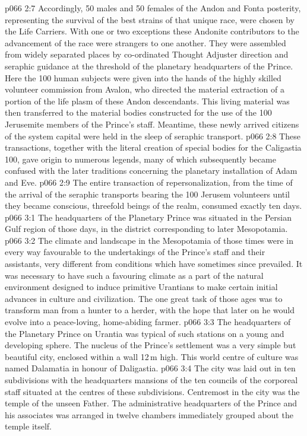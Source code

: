 \vs p066 2:7 Accordingly, 50 males and 50 females of the Andon and Fonta posterity, representing the survival of the best strains of that unique race, were chosen by the Life Carriers. With one or two exceptions these Andonite contributors to the advancement of the race were strangers to one another. They were assembled from widely separated places by co\hyp{}ordinated Thought Adjuster direction and seraphic guidance at the threshold of the planetary headquarters of the Prince. Here the 100 human subjects were given into the hands of the highly skilled volunteer commission from Avalon, who directed the material extraction of a portion of the life plasm of these Andon descendants. This living material was then transferred to the material bodies constructed for the use of the 100 Jerusemite members of the Prince’s staff. Meantime, these newly arrived citizens of the system capital were held in the sleep of seraphic transport.
\vs p066 2:8 \pc These transactions, together with the literal creation of special bodies for the Caligastia 100, gave origin to numerous legends, many of which subsequently became confused with the later traditions concerning the planetary installation of Adam and Eve.
\vs p066 2:9 The entire transaction of repersonalization, from the time of the arrival of the seraphic transports bearing the 100 Jerusem volunteers until they became conscious, threefold beings of the realm, consumed exactly ten days.
\vs p066 3:1 The headquarters of the Planetary Prince was situated in the Persian Gulf region of those days, in the district corresponding to later Mesopotamia.
\vs p066 3:2 The climate and landscape in the Mesopotamia of those times were in every way favourable to the undertakings of the Prince’s staff and their assistants, very different from conditions which have sometimes since prevailed. It was necessary to have such a favouring climate as a part of the natural environment designed to induce primitive Urantians to make certain initial advances in culture and civilization. The one great task of those ages was to transform man from a hunter to a herder, with the hope that later on he would evolve into a peace\hyp{}loving, home\hyp{}abiding farmer.
\vs p066 3:3 \pc The headquarters of the Planetary Prince on Urantia was typical of such stations on a young and developing sphere. The nucleus of the Prince’s settlement was a very simple but beautiful city, enclosed within a wall 12\,m high. This world centre of culture was named Dalamatia in honour of Daligastia.
\vs p066 3:4 The city was laid out in ten subdivisions with the headquarters mansions of the ten councils of the corporeal staff situated at the centres of these subdivisions. Centremost in the city was the temple of the unseen Father. The administrative headquarters of the Prince and his associates was arranged in twelve chambers immediately grouped about the temple itself.

